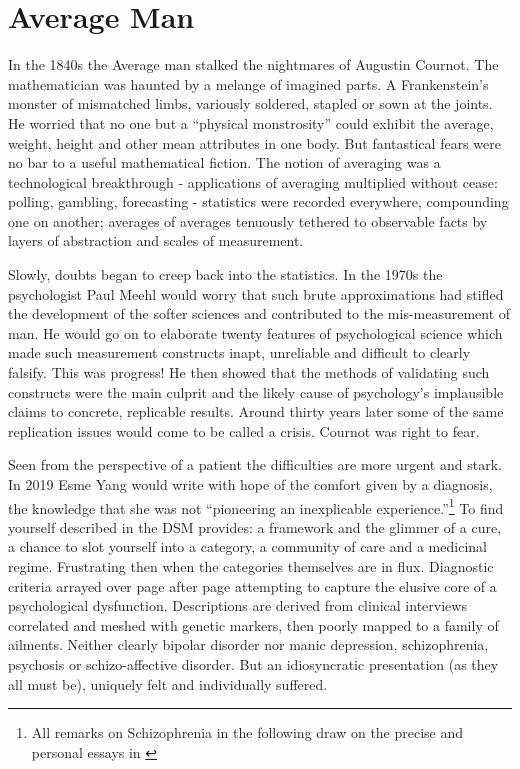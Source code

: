 \documentclass[
]{book}
\theoremstyle{definition}
\theoremstyle{definition}
\theoremstyle{definition}
\theoremstyle{remark}
\begin{document}
\hypertarget{average-man}{%
\section{Average Man}\label{average-man}}

In the 1840s the Average man stalked the nightmares of Augustin Cournot. The mathematician was haunted by a melange of imagined parts. A Frankenstein's monster of mismatched limbs, variously soldered, stapled or sown at the joints. He worried that no one but a ``physical monstrosity'' could exhibit the average, weight, height and other mean attributes in one body. \citep{stigler2016seven} But fantastical fears were no bar to a useful mathematical fiction. The notion of averaging was a technological breakthrough - applications of averaging multiplied without cease: polling, gambling, forecasting - statistics were recorded everywhere, compounding one on another; averages of averages tenuously tethered to observable facts by layers of abstraction and scales of measurement.

Slowly, doubts began to creep back into the statistics. In the 1970s the psychologist Paul Meehl would worry that such brute approximations had stifled the development of the softer sciences and contributed to the mis-measurement of man. He would go on to elaborate twenty features of psychological science which made such measurement constructs inapt, unreliable and difficult to clearly falsify. This was progress! \citep{MeehlTheoretical} He then showed that the methods of validating such constructs were the main culprit and the likely cause of psychology's implausible claims to concrete, replicable results. Around thirty years later some of the same replication issues would come to be called a crisis. Cournot was right to fear.

Seen from the perspective of a patient the difficulties are more urgent and stark. In 2019 Esme Yang would write with hope of the comfort given by a diagnosis, the knowledge that she was not ``pioneering an inexplicable experience.''\footnote{All remarks on Schizophrenia in the following draw on the precise and personal essays in \citep{WangSchizophrenia}} To find yourself described in the DSM provides: a framework and the glimmer of a cure, a chance to slot yourself into a category, a community of care and a medicinal regime. Frustrating then when the categories themselves are in flux. Diagnostic criteria arrayed over page after page attempting to capture the elusive core of a psychological dysfunction. Descriptions are derived from clinical interviews correlated and meshed with genetic markers, then poorly mapped to a family of ailments. Neither clearly bipolar disorder nor manic depression, schizophrenia, psychosis or schizo-affective disorder. But an idiosyncratic presentation (as they all must be), uniquely felt and individually suffered.
\end{document}

